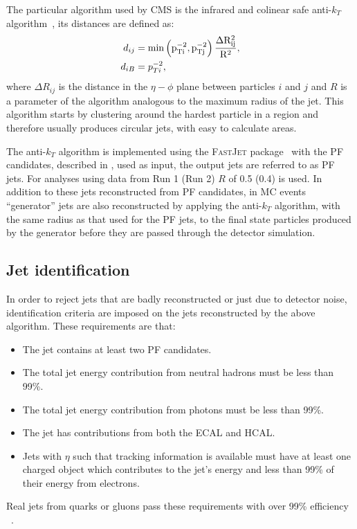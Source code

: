 The particular algorithm used by CMS is the infrared and colinear safe anti-$k_{T}$ algorithm~\cite{1126-6708-2008-04-063}, its distances are defined as:
\begin{align}
d_{ij}&=\rm{min}\left(p_{Ti}^{-2},p_{Tj}^{-2}\right)\frac{\Delta R_{ij}^{2}}{R^{2}},\\
d_{iB}&=p_{Ti}^{-2},
\end{align}
where $\Delta R_{ij}$ is the distance in the $\eta-\phi$ plane between particles $i$ and $j$ and $R$ is a parameter of the algorithm analogous to the maximum radius of the jet. This algorithm starts by clustering around the hardest particle in a region and therefore usually produces circular jets, with easy to calculate areas.

The anti-$k_{T}$ algorithm is implemented using the \textsc{FastJet} package~\cite{Cacciari:fastjet1} with the \ac{PF} candidates, described in , used as input, the output jets are referred to as \ac{PF} jets. For analyses using data from \LHC Run 1 (Run 2) $R$ of 0.5 (0.4) is used. In addition to these jets reconstructed from \ac{PF} candidates, in \ac{MC} events ``generator'' jets are also reconstructed by applying the anti-$k_{T}$ algorithm, with the same radius as that used for the \ac{PF} jets, to the final state particles produced by the generator before they are passed through the detector simulation.

\subsection{Jet identification}
\label{sec:jetid}
In order to reject jets that are badly reconstructed or just due to detector noise, identification criteria are imposed on the jets reconstructed by the above algorithm. These requirements are that:
\begin{itemize}
\item The jet contains at least two \ac{PF} candidates.
\item The total jet energy contribution from neutral hadrons must be less than 99\%.
\item The total jet energy contribution from photons must be less than 99\%.
\item The jet has contributions from both the \ac{ECAL} and \ac{HCAL}.
\item Jets with $\eta$ such that tracking information is available must have at least one charged object which contributes to the jet's energy and less than 99\% of their energy from electrons.
\end{itemize}
Real jets from quarks or gluons pass these requirements with over 99\% efficiency ~\cite{ARTICLE:CMSAN-14-227}.

